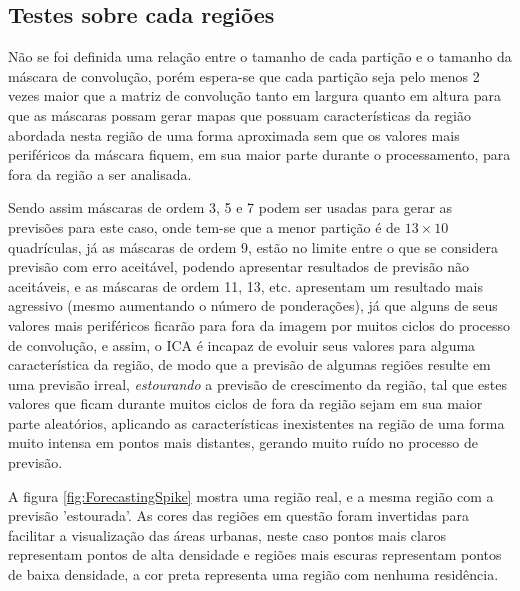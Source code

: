 \subsection{Testes sobre cada regiões}
\label{Exp:Testes sobre cada regiões}

Não se foi definida uma relação entre o tamanho de cada partição e o tamanho da máscara de convolução, porém espera-se que cada partição seja pelo menos 2 vezes maior que a matriz de convolução tanto em largura quanto em altura para que as máscaras possam gerar mapas que possuam características da região abordada nesta região de uma forma aproximada sem que os valores mais periféricos da máscara fiquem, em sua maior parte durante o processamento, para fora da região a ser analisada. 

Sendo assim máscaras de ordem 3, 5 e 7 podem ser usadas para gerar as previsões para este caso, onde tem-se que a menor partição é de \(13 \times 10\) quadrículas, já as máscaras  de ordem 9, estão no limite entre o que se considera previsão com erro aceitável, podendo apresentar resultados de previsão não aceitáveis, e as máscaras de ordem 11, 13, etc. apresentam um resultado mais agressivo (mesmo aumentando o número de ponderações), já que alguns de seus valores mais periféricos ficarão para fora da imagem por muitos ciclos do processo de convolução, e assim, o ICA é incapaz de evoluir seus valores para alguma característica da região, de modo que a previsão de algumas regiões resulte em uma previsão irreal, \emph{estourando} a previsão de crescimento da região, tal que estes valores que ficam durante muitos ciclos de fora da região sejam em sua maior parte aleatórios, aplicando as características inexistentes na região de uma forma muito intensa em pontos mais distantes, gerando muito ruído no processo de previsão. 

A figura \ref{fig:ForecastingSpike} mostra uma região real, e a mesma região com a previsão 'estourada'. As cores das regiões em questão foram invertidas para facilitar a visualização das áreas urbanas, neste caso pontos mais claros representam pontos de alta densidade e regiões mais escuras representam pontos de baixa densidade, a cor preta representa uma região com nenhuma residência.

